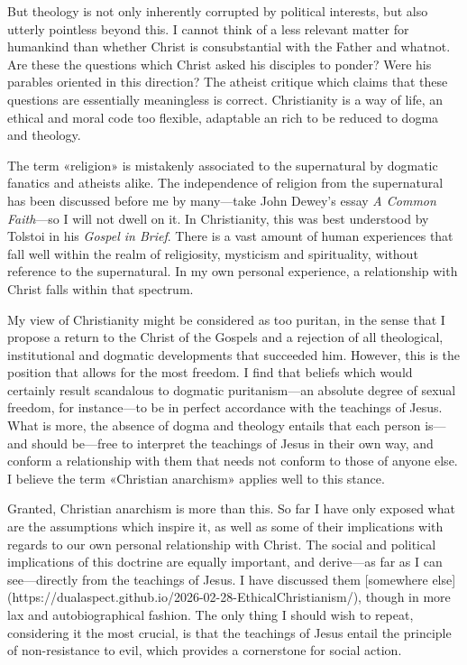 \documentclass[a4paper, 12pt]{article}
\begin{document}
But theology is not only inherently corrupted by political interests, but also
utterly pointless beyond this. I cannot think of a less relevant matter for
humankind than whether Christ is consubstantial with the Father and whatnot. Are
these the questions which Christ asked his disciples to ponder? Were his
parables oriented in this direction? The atheist critique which claims that
these questions are essentially meaningless is correct. Christianity is a way of
life, an ethical and moral code too flexible, adaptable an rich to be reduced to
dogma and theology. 

The term «religion» is mistakenly associated to the supernatural by dogmatic
fanatics and atheists alike. The independence of religion from the supernatural
has been discussed before me by many---take John Dewey's essay \textit{A Common
Faith}---so I will not dwell on it. In Christianity, this was best understood by
Tolstoi in his \textit{Gospel in Brief}. There is a vast amount of human
experiences that fall well within the realm of religiosity, mysticism and
spirituality, without reference to the supernatural. In my own personal
experience, a relationship with Christ falls within that spectrum.

My view of Christianity might be considered as too puritan, in the sense that I
propose a return to the Christ of the Gospels and a rejection of all
theological, institutional and dogmatic developments that succeeded him.
However, this is the position that allows for the most freedom. I find that
beliefs which would certainly result scandalous to dogmatic puritanism---an
absolute degree of sexual freedom, for instance---to be in perfect
accordance with the teachings of Jesus. What is more, the absence of dogma and
theology entails that each person is---and should be---free to interpret the
teachings of Jesus in their own way, and conform a relationship with them that
needs not conform to those of anyone else. I believe the term «Christian
anarchism» applies well to this stance.

Granted, Christian anarchism is more than this. So far I have only exposed what
are the assumptions which inspire it, as well as some of their implications with
regards to our own personal relationship with Christ. The social and political
implications of this doctrine are equally important, and derive---as far as I
can see---directly from the teachings of Jesus. I have discussed them [somewhere
else](https://dualaspect.github.io/2026-02-28-EthicalChristianism/), though
in more lax and autobiographical fashion. The only thing I should wish to
repeat, considering it the most crucial, is that the teachings of Jesus entail
the principle of non-resistance to evil, which provides a cornerstone for social
action.
\end{document}
